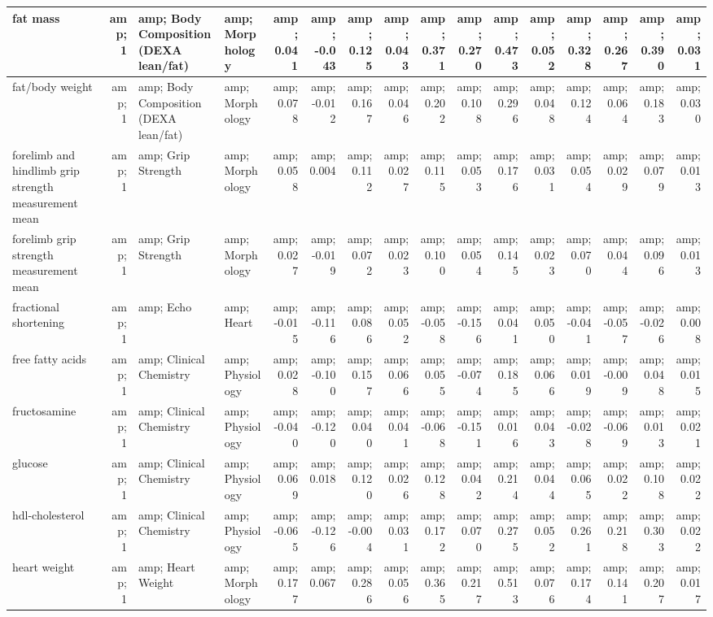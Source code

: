 \documentclass[]{article}
\begin{document}
\begin{table}
\begin{tabular}[t]{l|r|l|l|r|r|r|r|r|r|r|r|r|r|r|r}
\hline
fat mass &amp; 1 &amp; Body Composition (DEXA lean/fat) &amp; Morphology &amp; 0.041 &amp; -0.043 &amp; 0.125 &amp; 0.043 &amp; 0.371 &amp; 0.270 &amp; 0.473 &amp; 0.052 &amp; 0.328 &amp; 0.267 &amp; 0.390 &amp; 0.031\\
\hline
fat/body weight &amp; 1 &amp; Body Composition (DEXA lean/fat) &amp; Morphology &amp; 0.078 &amp; -0.012 &amp; 0.167 &amp; 0.046 &amp; 0.202 &amp; 0.108 &amp; 0.296 &amp; 0.048 &amp; 0.124 &amp; 0.064 &amp; 0.183 &amp; 0.030\\
\hline
forelimb and hindlimb grip strength measurement mean &amp; 1 &amp; Grip Strength &amp; Morphology &amp; 0.058 &amp; 0.004 &amp; 0.112 &amp; 0.027 &amp; 0.115 &amp; 0.053 &amp; 0.176 &amp; 0.031 &amp; 0.054 &amp; 0.029 &amp; 0.079 &amp; 0.013\\
\hline
forelimb grip strength measurement mean &amp; 1 &amp; Grip Strength &amp; Morphology &amp; 0.027 &amp; -0.019 &amp; 0.072 &amp; 0.023 &amp; 0.100 &amp; 0.054 &amp; 0.145 &amp; 0.023 &amp; 0.070 &amp; 0.044 &amp; 0.096 &amp; 0.013\\
\hline
fractional shortening &amp; 1 &amp; Echo &amp; Heart &amp; -0.015 &amp; -0.116 &amp; 0.086 &amp; 0.052 &amp; -0.058 &amp; -0.156 &amp; 0.041 &amp; 0.050 &amp; -0.041 &amp; -0.057 &amp; -0.026 &amp; 0.008\\
\hline
free fatty acids &amp; 1 &amp; Clinical Chemistry &amp; Physiology &amp; 0.028 &amp; -0.100 &amp; 0.157 &amp; 0.066 &amp; 0.055 &amp; -0.074 &amp; 0.185 &amp; 0.066 &amp; 0.019 &amp; -0.009 &amp; 0.048 &amp; 0.015\\
\hline
fructosamine &amp; 1 &amp; Clinical Chemistry &amp; Physiology &amp; -0.040 &amp; -0.120 &amp; 0.040 &amp; 0.041 &amp; -0.068 &amp; -0.151 &amp; 0.016 &amp; 0.043 &amp; -0.028 &amp; -0.069 &amp; 0.013 &amp; 0.021\\
\hline
glucose &amp; 1 &amp; Clinical Chemistry &amp; Physiology &amp; 0.069 &amp; 0.018 &amp; 0.120 &amp; 0.026 &amp; 0.128 &amp; 0.042 &amp; 0.214 &amp; 0.044 &amp; 0.065 &amp; 0.022 &amp; 0.108 &amp; 0.022\\
\hline
hdl-cholesterol &amp; 1 &amp; Clinical Chemistry &amp; Physiology &amp; -0.065 &amp; -0.126 &amp; -0.004 &amp; 0.031 &amp; 0.172 &amp; 0.070 &amp; 0.275 &amp; 0.052 &amp; 0.261 &amp; 0.218 &amp; 0.303 &amp; 0.022\\
\hline
heart weight &amp; 1 &amp; Heart Weight &amp; Morphology &amp; 0.177 &amp; 0.067 &amp; 0.286 &amp; 0.056 &amp; 0.365 &amp; 0.217 &amp; 0.513 &amp; 0.076 &amp; 0.174 &amp; 0.141 &amp; 0.207 &amp; 0.017\\

\end{tabular}
\end{table}
\end{document}

